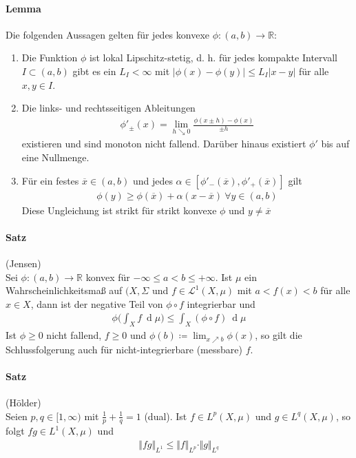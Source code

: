 \documentclass[12pt,a4paper,fleqn]{article}
\def\d{{\operatorname{d}}}
\begin{document}
\paragraph{Lemma} Die folgenden Aussagen gelten für jedes konvexe $\phi: (a, b) \rightarrow \mathbb{R}$:
\begin{enumerate}
\item Die Funktion $\phi$ ist lokal Lipschitz-stetig, d. h. für jedes kompakte Intervall $I \subset (a, b)$ gibt es ein $L_I < \infty$ mit $\vert \phi(x) - \phi(y) \vert \leq L_I \vert x - y \vert$ für alle $x, y \in I$.
\item Die links- und rechtsseitigen Ableitungen
\begin{align*}
\phi'_{\pm}(x) = \lim_{h \searrow 0} \frac{\phi (x \pm h) - \phi (x)}{\pm h}
\end{align*}
existieren und sind monoton nicht fallend. Darüber hinaus existiert $\phi'$ bis auf eine Nullmenge.
\item Für ein festes $\overline{x} \in (a, b)$ und jedes $\alpha \in [\phi'_-(\overline{x}), \phi'_+(\overline{x})]$ gilt
\begin{align*}
\phi (y) \geq \phi(\overline{x}) + \alpha(x - \overline{x})\ \forall y \in (a, b)
\end{align*}
Diese Ungleichung ist strikt für strikt konvexe $\phi$ und $y \not = \overline{x}$
\end{enumerate}

\paragraph{Satz} (Jensen)\\
Sei $\phi: (a, b) \rightarrow \mathbb{R}$ konvex für $-\infty \leq a < b \leq +\infty$. Ist $\mu$ ein Wahrscheinlichkeitsmaß auf $(X, \Sigma$ und $f \in \mathscr{L}^1(X, \mu)$ mit $a < f(x) < b$ für alle $x \in X$, dann ist der negative Teil von $\phi \circ f$ integrierbar und
\begin{align*}
\phi \bigg(\int_X f\ \d\mu \bigg) \leq \int_X (\phi \circ f)\ \d\mu 
\end{align*}
Ist $\phi \geq 0$ nicht fallend, $f \geq 0$ und $\phi(b) \coloneqq \lim_{x \nearrow b} \phi(x)$, so gilt die Schlussfolgerung auch für nicht-integrierbare (messbare) $f$.

\paragraph{Satz} (Hölder)\\
Seien $p, q \in [1, \infty)$ mit $\frac{1}{p} + \frac{1}{q} = 1$ (dual). Ist $f \in L^p(X, \mu)$ und $g \in L^{q}(X, \mu)$, so folgt $fg \in {L}^1(X, \mu)$ und 
\begin{align*}
\Vert fg \Vert_{L^1} \leq \Vert f \Vert_{L^p} \cdot \Vert g \Vert_{L^{q}}
\end{align*}
\end{document}
